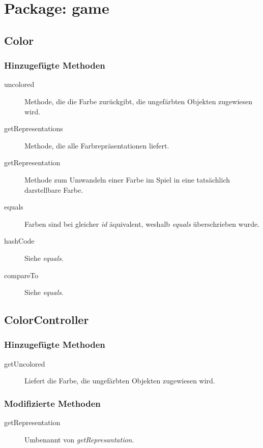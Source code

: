 \section{Package: game}

\subsection{Color}

\subsubsection{Hinzugefügte Methoden}
\begin{description}
\item[uncolored]
Methode, die die Farbe zurückgibt, die ungefärbten Objekten zugewiesen wird.

\item[getRepresentations]
Methode, die alle Farbrepräsentationen liefert.

\item[getRepresentation]
Methode zum Umwandeln einer Farbe im Spiel in eine tatsächlich darstellbare Farbe.

\item[equals]
Farben sind bei gleicher \emph{id} äquivalent, weshalb \emph{equals} überschrieben wurde.

\item[hashCode]
Siehe \emph{equals}.

\item[compareTo]
Siehe \emph{equals}.

\end{description}


\subsection{ColorController}

\subsubsection{Hinzugefügte Methoden}
\begin{description}
\item[getUncolored]
Liefert die Farbe, die ungefärbten Objekten zugewiesen wird.
\end{description}

\subsubsection{Modifizierte Methoden}
\begin{description}
\item[getRepresentation]
Umbenannt von \emph{getRepresantation}.

\end{description}



